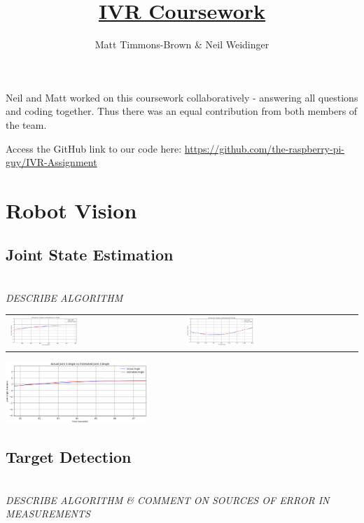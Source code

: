 \documentclass[11pt]{article}
\title{\underline{IVR Coursework}}
\author{Matt Timmons-Brown \& Neil Weidinger}
\begin{document}
\maketitle

Neil and Matt worked on this coursework collaboratively - answering all questions and coding together. Thus there was an equal contribution from both members of the team.

Access the GitHub link to our code here: \url{https://github.com/the-raspberry-pi-guy/IVR-Assignment}

\setcounter{section}{1}
\section{Robot Vision}

\subsection{Joint State Estimation}
\textit{\\DESCRIBE ALGORITHM}
\begin{center}
    \begin{tabular}{ll}
        \includegraphics[width=0.4\textwidth]{images/2.1_joint2.png}
        &
        \includegraphics[width=0.4\textwidth]{images/2.1_joint3.png}
    \end{tabular}
    \includegraphics[width=0.4\textwidth]{images/2.1_joint4.png}
\end{center}

\subsection{Target Detection}
\textit{\\DESCRIBE ALGORITHM \& COMMENT ON SOURCES OF ERROR IN MEASUREMENTS}
\end{document}
